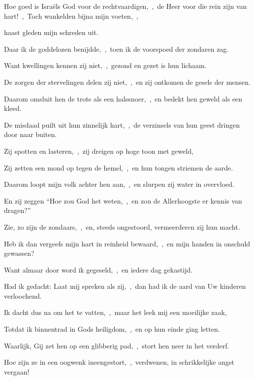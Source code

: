 \documentclass[12pt,twoside,a5paper]{article}
\begin{document}

\begin{halfparskip}
   Hoe goed is Israëls God voor de rechtvaardigen,~\sep\ de Heer voor die rein zijn van hart!~\sep\ Toch wankelden bijna mijn voeten,~\sep


  haast gleden mijn schreden uit.

  Daar ik de goddelozen benijdde,~\sep\ toen ik de voorspoed der zondaren zag.

  Want kwellingen kennen zij niet,~\sep\ gezond en gezet is hun lichaam.

  De zorgen der stervelingen delen zij niet,~\sep\ en zij ontkomen de gesels der mensen.

  Daarom omsluit hen de trots als een halssnoer,~\sep\ en bedekt hen geweld als een kleed.

  De misdaad puilt uit hun zinnelijk hart,~\sep\ de verzinsels van hun geest dringen door naar buiten.

  Zij spotten en lasteren,~\sep\ zij dreigen op hoge toon met geweld,

  Zij zetten een mond op tegen de hemel,~\sep\ en hun tongen striemen de aarde.

  Daarom loopt mijn volk achter hen aan,~\sep\ en slurpen zij water in overvloed.

  En zij zeggen ``Hoe zou God het weten,~\sep\ en zou de Allerhoogste er kennis van dragen?''

  Zie, zo zijn de zondaars,~\sep\ en, steeds ongestoord, vermeerderen zij hun macht.

  Heb ik dan vergeefs mijn hart in reinheid bewaard,~\sep\ en mijn handen in onschuld gewassen?

  Want almaar door word ik gegeseld,~\sep\ en iedere dag gekastijd.

  Had ik gedacht: Laat mij spreken als zij,~\sep\ dan had ik de aard van Uw kinderen verloochend.

  Ik dacht dus na om het te vatten,~\sep\ maar het leek mij een moeilijke zaak,

  Totdat ik binnentrad in Gods heiligdom,~\sep\ en op hun einde ging letten.

  Waarlijk, Gij zet hen op een glibberig pad,~\sep\ stort hen neer in het verderf.

  Hoe zijn ze in een oogwenk ineengestort,~\sep\ verdwenen, in schrikkelijke angst vergaan!


\end{halfparskip}
\end{document}
